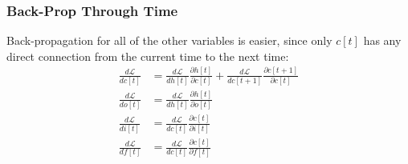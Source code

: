 \documentclass{beamer}
\begin{document}
\begin{frame}
  \frametitle{Back-Prop Through Time}

  Back-propagation for all of the other variables is easier, since
  only $c[t]$ has any direct connection from the current time to the
  next time:
  \begin{align*}
    \frac{d{\mathcal L}}{dc[t]}
    &=\frac{d{\mathcal L}}{dh[t]}\frac{\partial h[t]}{\partial c[t]}+
    \frac{d{\mathcal L}}{dc[t+1]}\frac{\partial c[t+1]}{\partial c[t]}\\
    \frac{d{\mathcal L}}{do[t]}&=
    \frac{d{\mathcal L}}{dh[t]}\frac{\partial h[t]}{\partial o[t]}\\
    \frac{d{\mathcal L}}{di[t]}&=
    \frac{d{\mathcal L}}{dc[t]}\frac{\partial c[t]}{\partial i[t]}\\
    \frac{d{\mathcal L}}{df[t]}&=
    \frac{d{\mathcal L}}{dc[t]}\frac{\partial c[t]}{\partial f[t]}
  \end{align*}
\end{frame}
\end{document}
